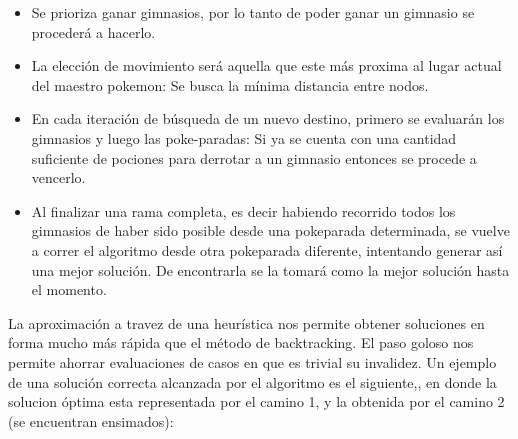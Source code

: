 \begin{itemize}
\item Se prioriza ganar gimnasios, por lo tanto de poder ganar un gimnasio se procederá a hacerlo.
\item La elección de movimiento será aquella que este más proxima al lugar actual del maestro pokemon: Se busca la m\'inima distancia entre nodos. 
\item En cada iteraci\'on de b\'usqueda de un nuevo destino, primero se evaluarán los gimnasios y luego las poke-paradas: Si ya se cuenta con una cantidad suficiente de pociones para derrotar a un gimnasio entonces se procede a vencerlo.
\item Al finalizar una rama completa, es decir habiendo recorrido todos los gimnasios de haber sido posible desde una pokeparada determinada, se vuelve a correr el algoritmo desde otra pokeparada diferente, intentando generar así una mejor solución. De encontrarla se la tomará como la mejor solución hasta el momento.
\end{itemize}
 



La aproximación a travez de una heurística nos permite obtener soluciones en forma mucho más rápida que el método de backtracking. El paso goloso nos permite ahorrar evaluaciones de casos en que es trivial su invalidez. Un ejemplo de una solución correcta alcanzada por el algoritmo es el siguiente,, en donde la solucion óptima esta representada por el camino 1, y la obtenida por el camino 2 (se encuentran ensimados):

